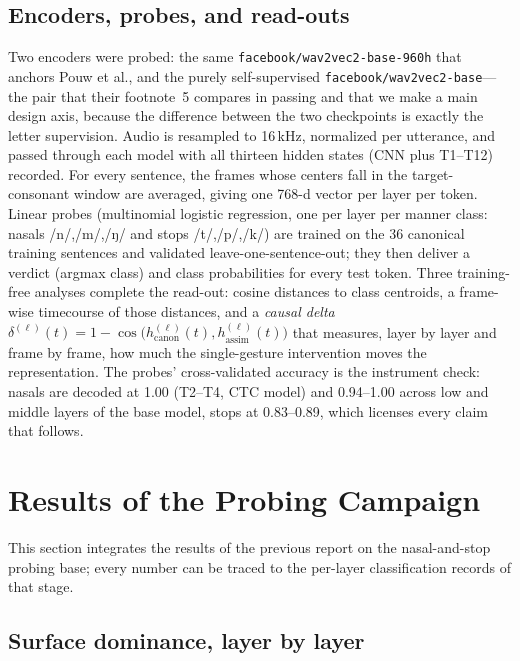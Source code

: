 \documentclass[11pt,a4paper]{article}
\newcommand{\sampa}[1]{\texttt{#1}}
\begin{document}
\subsection{Encoders, probes, and read-outs}

Two encoders were probed: the same \sampa{facebook/wav2vec2-base-960h}
that anchors Pouw et al., and the purely self-supervised
\sampa{facebook/wav2vec2-base}---the pair that their footnote~5
compares in passing and that we make a main design axis, because the
difference between the two checkpoints is exactly the letter
supervision. Audio is resampled to 16\,kHz, normalized per utterance,
and passed through each model with all thirteen hidden states (CNN
plus T1--T12) recorded. For every sentence, the frames whose centers
fall in the target-consonant window are averaged, giving one 768-d
vector per layer per token. Linear probes (multinomial logistic
regression, one per layer per manner class: nasals /n/,/m/,/ŋ/ and
stops /t/,/p/,/k/) are trained on the 36 canonical training sentences
and validated leave-one-sentence-out; they then deliver a verdict
(argmax class) and class probabilities for every test token. Three
training-free analyses complete the read-out: cosine distances to class
centroids, a frame-wise timecourse of those distances, and a
\emph{causal delta} $\delta^{(\ell)}(t)=1-\cos\!\bigl(h^{(\ell)}_{\text%
{canon}}(t),h^{(\ell)}_{\text{assim}}(t)\bigr)$ that measures, layer by
layer and frame by frame, how much the single-gesture intervention
moves the representation. The probes' cross-validated accuracy is the
instrument check: nasals are decoded at 1.00 (T2--T4, CTC model) and
0.94--1.00 across low and middle layers of the base model, stops at
0.83--0.89, which licenses every claim that follows.

\needspace{0.22\textheight}
\section{Results of the Probing Campaign}\label{sec:results}

This section integrates the results of the previous report on the
nasal-and-stop probing base; every number can be traced to the
per-layer classification records of that stage.

\subsection{Surface dominance, layer by layer}
\end{document}
